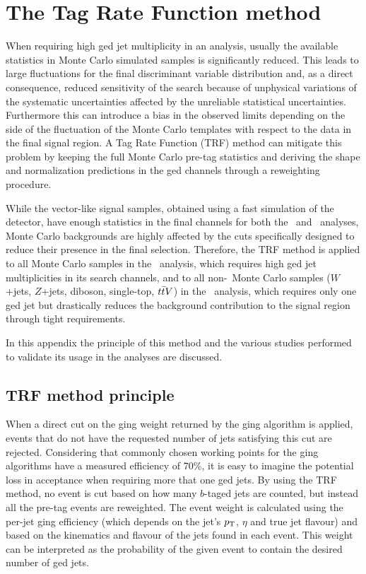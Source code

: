 \clearpage{\pagestyle{empty}\cleardoublepage}

\chapter{The Tag Rate Function method}\label{app:trf}

When requiring high \btag ged jet multiplicity in an analysis, 
usually the available statistics in Monte Carlo simulated  samples 
is significantly reduced. This leads to large fluctuations
for the final discriminant variable distribution
and, as a direct consequence, reduced sensitivity of
the search because of unphysical variations of 
the systematic uncertainties affected by the unreliable
statistical uncertainties.
Furthermore this can introduce a bias in the observed limits
depending on the side of the fluctuation of the Monte Carlo
templates with respect to the data in the final signal region.
A Tag Rate Function (TRF) method can mitigate this problem
by keeping the full Monte Carlo pre-tag statistics and deriving
the shape and normalization predictions in the \btag ged channels
through a reweighting procedure.

While the vector-like signal samples, obtained using a fast simulation
of the detector, have enough statistics in the final channels for
both the \wbx\ and \htx\ analyses, Monte Carlo backgrounds are highly
affected by the cuts specifically designed to reduce their presence
in the final selection.
Therefore, the TRF method is applied to all Monte Carlo samples in
the \htx\ analysis, which requires high \btag ged jet multiplicities
in its search channels, and to all non-\ttbar\ Monte Carlo samples
($W$+jets, $Z$+jets, diboson, single-top, $\ttbar V$) in the \wbx\ 
analysis, which requires only one \btag ged jet but drastically
reduces the background contribution to the signal region through
tight requirements.

In this appendix the principle of this method and the various 
studies performed to validate its usage in the analyses
are discussed.



\section{TRF method principle}

When a direct cut on the
\btag ging weight returned by the \btag ging algorithm
is applied, events that do not have the requested number
of jets satisfying this cut are rejected. Considering that
commonly chosen working points for the \btag ging algorithms
have a measured efficiency of 70\%, it is easy to imagine the
potential loss in acceptance when requiring more that one
\btag ged jets.
By using the TRF method, no event is cut based on how many
$b$-taged jets are counted, but instead all the pre-tag events 
are reweighted.
The event weight is calculated using the
per-jet  \btag ging efficiency
(which depends on the jet's $\pt$, $\eta$ and true jet flavour)
and based on the kinematics and flavour of the 
jets found in each event.
This weight can be interpreted as the probability of the 
given event to contain the desired number of \btag ged jets. 

